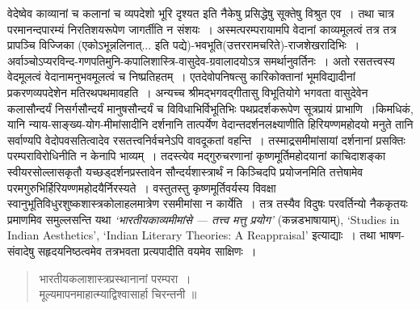 {\dev वेदेष्वेव काव्यानां च कलानां च व्यपदेशो भूरि दृश्यत इति नैकेषु प्रसिद्धेषु सूक्तेषु विश्रुत एव~। तथा चात्र परमानन्दपारम्यं निरतिशयरूपेण जागर्तीति न संशयः~। अस्मत्परम्परायामपि वेदानां काव्यमूलत्वं तत्र तत्र प्रापञ्चि विज्जिका (एकोऽभून्नलिनात्... इति पद्ये)-भवभूति(उत्तर\-रामचरिते)-राजशेखरादिभिः~। अर्वाञ्चोऽप्यरविन्द-गणपतिमुनि-कपालिशास्त्रि-वासुदेव-\-\-ग्रवालादयोऽत्र समर्थानुवर्तिनः~। अतो रसतत्त्वस्य वेदमूलत्वं वेदानामनुभवमूलत्वं च निष्प्रतिहतम्~।  एतदेवोपनिषत्सु कारिकोक्तानां भूमविद्यादीनां प्रकरणव्यपदेशेन मतिरथपथ\-मावहति~। अन्यच्च श्रीमद्भगवद्गीतासु विभूतियोगे भगवता वासुदेवेन कलासौन्दर्यं निसर्ग\-सौन्दर्यं मानुषसौन्दर्यं च विविधाभिर्विभूतिभिः पथप्रदर्शकरूपेण सूत्रप्रायं प्राभाणि~।\break किमधिकं, यानि न्याय-साङ्ख्य-योग-मीमांसादीनि दर्शनानि तात्पर्येण वेदान्तदर्शनलक्ष्याणीति हिरियण्ण\-महोदयो मनुते तानि सर्वाण्यपि वेदोपवसतित्वादेव रसतत्त्वनिर्वचनेऽपि वावदूकतां वहन्ति~। तस्माद्रसमीमांसायां दर्शनानां प्रसक्तिः परम्पराविरोधिनीति न केनापि भाव्यम्~। तदस्त्येव मद्गुरुचरणानां कृष्णमूर्तिमहोदयानां काचिदाशङ्का स्वीयरसोल्लासकृतौ यच्छड्दर्शन\-प्रस्तावेन सौन्दर्यशास्त्रार्थं न किञ्चिदपि प्रयोजनमिति तत्तेषामेव परमगुरुभिर्हिरियण्णमहो\-दयैर्निरस्यते~। वस्तुतस्तु कृष्णमूर्तिवर्यस्य विवक्षा स्वानुभूतिविधुरशुष्कशास्त्रकोलाहलमात्रेण रसमीमांसा न कार्येति~। तत्र तस्यैव विदुषः परवर्तिन्यो नैककृतयः प्रमाणमिव समुल्लसन्ति यथा} \textsl{\dev ‘भारतीय\-काव्यमीमांसे --- तत्त्व मत्तु प्रयोग’} {\dev (कन्नडभाषायाम्)}, `Studies in Indian Aesthetics', `Indian Literary Theories: A Reappraisal' {\dev इत्याद्याः~। तथा भाषण-संवादेषु सहृदयनिष्ठत्वमेव तत्रभवता प्रत्यपादीति वयमेव साक्षिणः~।} 
\begin{quote}
{\dev भारतीयकलाशास्त्रप्रस्थानानां परम्परा~।}\\
{\dev मूल्यमापनमाहात्म्याद्विश्वासार्हा चिरन्तनी ॥}
\end{quote}

